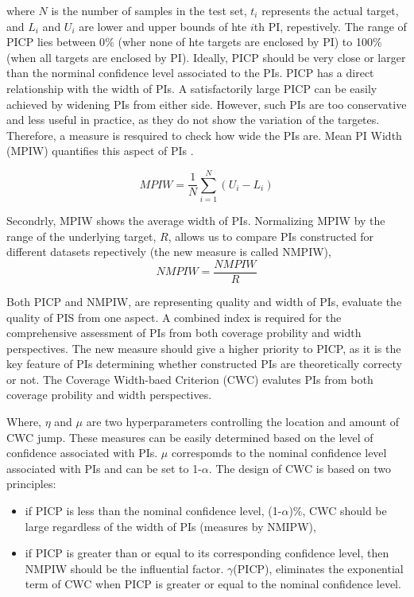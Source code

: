 \documentclass[review]{elsarticle}
\begin{document}
        where $N$ is the number of samples in the test set, $t_{i}$ represents the actual target, and $L_{i}$ and $U_{i}$ are lower and upper bounds of hte $i$th PI, repestively. The range of PICP lies between 0$\%$ (wher none of hte targets are enclosed by PI) to 100$\%$ (when all targets are enclosed by PI). Ideally, PICP should be very close or larger than the norminal confidence level associated to the PIs.
        PICP has a direct relationship with the width of PIs. A satisfactorily large PICP can be easily achieved by widening PIs from either side. However, such PIs are too conservative and less useful in practice, as they do not show the variation of the targetes. Therefore, a measure is resquired to check how wide the PIs are. Mean PI Width (MPIW) quantifies this aspect of PIs \cite{Khosravi2010}.

        \begin{equation}
          MPIW = \frac{1}{N} \sum_{i=1}^{N} (U_{i}-L_{i})
          \label{eq.MPIW}
        \end{equation}

        Secondrly, MPIW shows the average width of PIs. Normalizing MPIW by the range of the underlying target, $R$, allows us to compare PIs constructed for different datasets repectively (the new measure is called NMPIW),
        \begin{equation}
          NMPIW = \frac{NMPIW}{R}
          \label{eq.NMPIW}
        \end{equation}

        Both PICP and NMPIW, are representing quality and width of PIs, evaluate the quality of PIS from one aspect. A combined index is required for the comprehensive assessment of PIs from both coverage probility and width perspectives. The new measure should give a higher priority to PICP, as it is the key feature of PIs determining whether constructed PIs are theoretically correcty or not. The Coverage Width-baed Criterion (CWC) evalutes PIs from both coverage probility and width perspectives.

        Where, $\eta$ and $\mu$ are two hyperparameters controlling the location and amount of CWC jump. These measures can be easily determined based on the level of confidence associated with PIs. $\mu$ correspomds to the nominal confidence level associated with PIs and can be set to 1-$\alpha$. The design of CWC is based on two principles:

        \begin{itemize}
          \item if PICP is less than the nominal confidence level, (1-$\alpha$)$\%$, CWC should be large regardless of the width of PIs (measures by NMIPW),
          \item if PICP is greater than or equal to its corresponding confidence level, then NMPIW should be the influential factor. $\gamma$(PICP), eliminates the exponential term of CWC when PICP is greater or equal to the nominal confidence level.
        \end{itemize}
\end{document}
